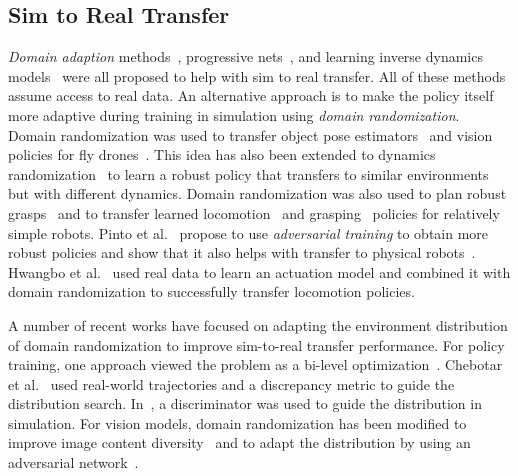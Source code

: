 \subsection{Sim to Real Transfer}

\emph{Domain adaption} methods~\citep{DBLP:journals/corr/TzengDHFPLSD15, DBLP:journals/corr/GuptaDLAL17}, progressive nets~\citep{DBLP:conf/corl/RusuVRHPH17}, and learning inverse dynamics models~\citep{DBLP:journals/corr/ChristianoSMSBT16} were all proposed to help with sim to real transfer.
All of these methods assume access to real data.
An alternative approach is to make the policy itself more adaptive during training in simulation using \emph{domain randomization}.
Domain randomization was used to transfer object pose estimators~\citep{tobin2017domain} and vision policies for fly drones~\citep{DBLP:conf/rss/SadeghiL17}.
This idea has also been extended to dynamics randomization~\citep{peng2017sim, DBLP:journals/corr/AntonovaCSK17, DBLP:journals/corr/abs-1804-10332, DBLP:conf/rss/YuTLT17, openai2018learning} to learn a robust policy that transfers to similar environments but with different dynamics.
Domain randomization was also used to plan robust grasps~\citep{DBLP:conf/rss/MahlerLNLDLOG17, DBLP:journals/corr/abs-1709-06670, DBLP:journals/corr/abs-1710-06425} and to transfer learned locomotion~\citep{DBLP:journals/corr/abs-1804-10332} and grasping~\citep{DBLP:journals/corr/abs-1802-09564} policies for relatively simple robots.
Pinto et al.~\citep{pinto2017robust} propose to use \emph{adversarial training} to obtain more robust policies and show that it also helps with transfer to physical robots~\citep{pinto2017supervision}. Hwangbo et al.~\cite{hwangbo2019learning} used real data to learn an actuation model and combined it with domain randomization to successfully transfer locomotion policies.

A number of recent works have focused on adapting the environment distribution of domain randomization to improve sim-to-real transfer performance. For policy training, one approach viewed the problem as a bi-level optimization~\citep{Vuong2019, Ruiz2018}. Chebotar et al.~\citep{Chebotar2018} used real-world trajectories and a discrepancy metric to guide the distribution search. In~\citep{Mehta2019}, a discriminator was used to guide the distribution in simulation. For vision models, domain randomization has been modified to improve image content diversity~\citep{Kar2019, Prakash2018, Cubuk2018} and to adapt the distribution by using an adversarial network~\citep{Zakharov2019}.

